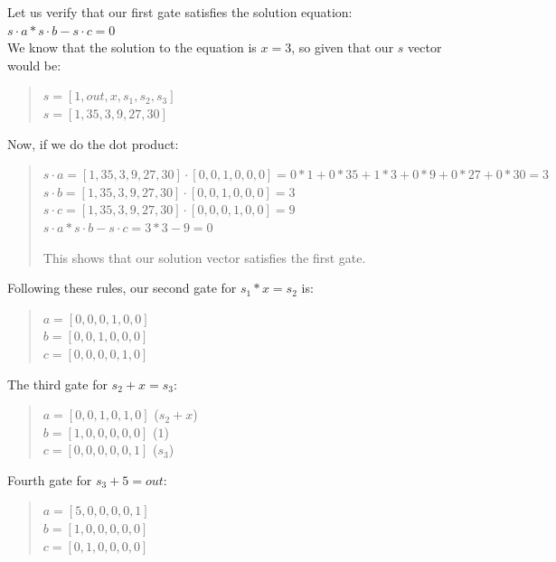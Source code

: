  Let us verify that our first gate satisfies the solution equation:
   \\
   $s \cdot a * s \cdot b - s \cdot c = 0$
   \\
 We know that the solution to the equation is $ x = 3 $, so given that our $s$ vector
 would be: 
   \begin{quote}
   $s=[1,out,x,s_1,s_2,s_3]$
   \\
   $s=[1,35,3,9,27,30]$
\end{quote}

Now, if we do the dot product:
\begin{quote}
   $s \cdot a =  [1,35,3,9,27,30] \cdot [0,0,1,0,0,0] = 0*1+0*35+1*3+0*9+0*27+0*30= 3$ 
   $s \cdot b = [1,35,3,9,27,30] \cdot [0,0,1,0,0,0] = 3$ 
   $s \cdot c = [1,35,3,9,27,30] \cdot [0,0,0,1,0,0] = 9$ 
$s \cdot a * s \cdot b - s \cdot c =  3 * 3 - 9 = 0$

This shows that our solution vector satisfies the first gate.
\end{quote}

Following these rules, our second gate for $s_1*x=s_2$ is:
\begin{quote}
   $a = [0,0,0,1,0,0]$
   \\
   $b = [0,0,1,0,0,0]$
   \\
   $c = [0,0,0,0,1,0]$
\end{quote}

The third gate for $s_2+x=s_3$:
\begin{quote}
   $a = [0,0,1,0,1,0]$ ($s_2+x$)
   \\
   $b = [1,0,0,0,0,0]$ ($1$)
   \\
   $c = [0,0,0,0,0,1]$ ($s_3$)
\end{quote}

Fourth gate for $s_3+5=out$:
\begin{quote}
   $a = [5,0,0,0,0,1]$
   \\
   $b = [1,0,0,0,0,0]$
   \\
   $c = [0,1,0,0,0,0]$
\end{quote}

